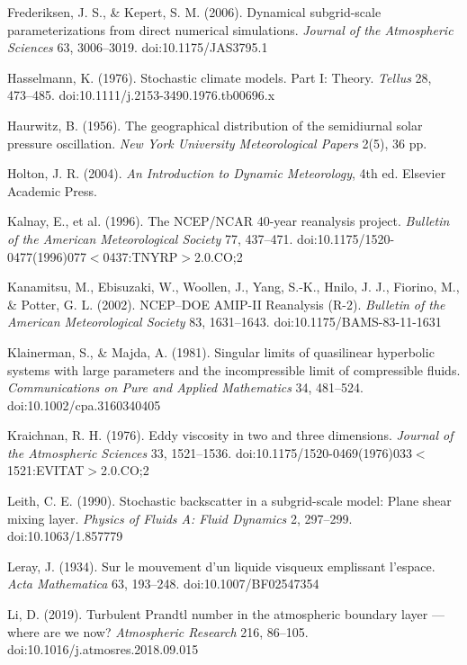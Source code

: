\documentclass[11pt]{article}
\begin{document}
Frederiksen, J. S., \& Kepert, S. M. (2006). Dynamical subgrid-scale parameterizations from direct numerical simulations. \emph{Journal of the Atmospheric Sciences} 63, 3006--3019. doi:10.1175/JAS3795.1

Hasselmann, K. (1976). Stochastic climate models. Part I: Theory. \emph{Tellus} 28, 473--485. doi:10.1111/\hspace{0pt}j.2153-3490.1976.tb00696.x

Haurwitz, B. (1956). The geographical distribution of the semidiurnal solar pressure oscillation. \emph{New York University Meteorological Papers} 2(5), 36 pp.

Holton, J. R. (2004). \emph{An Introduction to Dynamic Meteorology}, 4th ed. Elsevier Academic Press.

Kalnay, E., et al. (1996). The NCEP/NCAR 40-year reanalysis project. \emph{Bulletin of the American Meteorological Society} 77, 437--471. doi:10.1175/\hspace{0pt}1520-0477(1996)077$<$0437:TNYRP$>$2.0.CO;2

Kanamitsu, M., Ebisuzaki, W., Woollen, J., Yang, S.-K., Hnilo, J. J., Fiorino, M., \& Potter, G. L. (2002). NCEP--DOE AMIP-II Reanalysis (R-2). \emph{Bulletin of the American Meteorological Society} 83, 1631--1643. doi:10.1175/BAMS-83-11-1631

Klainerman, S., \& Majda, A. (1981). Singular limits of quasilinear hyperbolic systems with large parameters and the incompressible limit of compressible fluids. \emph{Communications on Pure and Applied Mathematics} 34, 481--524. doi:10.1002/cpa.3160340405

Kraichnan, R. H. (1976). Eddy viscosity in two and three dimensions. \emph{Journal of the Atmospheric Sciences} 33, 1521--1536. doi:10.1175/\hspace{0pt}1520-0469(1976)033$<$1521:EVITAT$>$2.0.CO;2

Leith, C. E. (1990). Stochastic backscatter in a subgrid-scale model: Plane shear mixing layer. \emph{Physics of Fluids A: Fluid Dynamics} 2, 297--299. doi:10.1063/1.857779

Leray, J. (1934). Sur le mouvement d'un liquide visqueux emplissant l'espace. \emph{Acta Mathematica} 63, 193--248. doi:10.1007/\hspace{0pt}BF02547354

Li, D. (2019). Turbulent Prandtl number in the atmospheric boundary layer --- where are we now? \emph{Atmospheric Research} 216, 86--105. doi:10.1016/j.atmosres.2018.09.015
\end{document}
